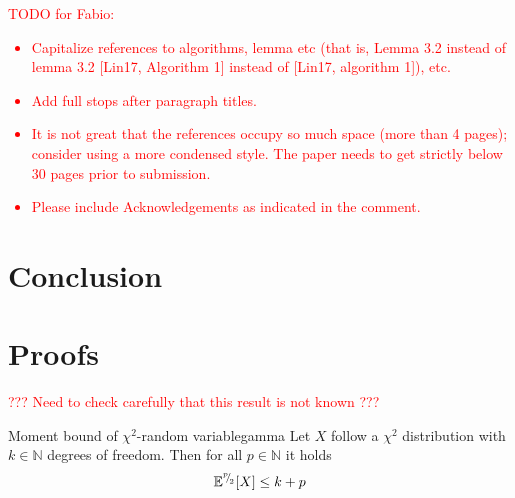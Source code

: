 \documentclass[12pt]{article}
\begin{document}
\textcolor{red}{TODO for Fabio:
\begin{itemize}
 \item Capitalize references to algorithms, lemma etc (that is, Lemma 3.2 instead of lemma 3.2 [Lin17, Algorithm 1] instead of [Lin17, algorithm 1]), etc.
 \item Add full stops after paragraph titles.
 \item It is not great that the references occupy so much space (more than 4 pages); consider using a more condensed style. The paper needs to get strictly below 30 pages prior to submission. 
 \item Please include Acknowledgements as indicated in the comment.
\end{itemize}
}
\color{blue}



%




\section{Conclusion}
\label{sec:conclusion}



%
\printbibliography

\appendix

\section{Proofs}

\textcolor{red}{??? Need to check carefully that this result is not known ???}

\begin{lemma}{Moment bound of $\chi^2$-random variable}{gamma}
    Let $X$ follow a $\chi^2$ distribution with $k \in \mathbb{N}$ degrees of freedom. Then for all $p \in \mathbb{N}$ it holds
    \begin{equation}
        \mathbb{E}^{{}^{p}{\mskip -5mu/\mskip -3mu}_{2}}[X] \leq k + p
    \end{equation}
\end{lemma}
\end{document}
